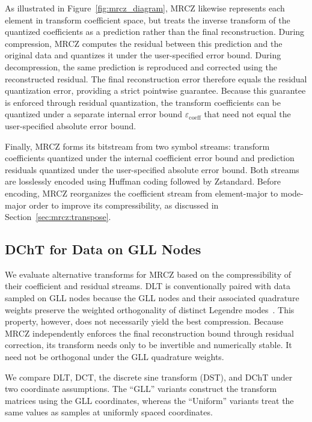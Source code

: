 As illustrated in Figure~\ref{fig:mrcz_diagram}, MRCZ likewise represents each element in transform coefficient space, but treats the inverse transform of the quantized coefficients as a prediction rather than the final reconstruction. During compression, MRCZ computes the residual between this prediction and the original data and quantizes it under the user-specified error bound. During decompression, the same prediction is reproduced and corrected using the reconstructed residual. The final reconstruction error therefore equals the residual quantization error, providing a strict pointwise guarantee. Because this guarantee is enforced through residual quantization, the transform coefficients can be quantized under a separate internal error bound $\varepsilon_{\mathrm{coeff}}$ that need not equal the user-specified absolute error bound.

Finally, MRCZ forms its bitstream from two symbol streams: transform coefficients quantized under the internal coefficient error bound and prediction residuals quantized under the user-specified absolute error bound. Both streams are losslessly encoded using Huffman coding followed by Zstandard. Before encoding, MRCZ reorganizes the coefficient stream from element-major to mode-major order to improve its compressibility, as discussed in Section~\ref{sec:mrcz:transpose}.

\subsection{DChT for Data on GLL Nodes}\label{sec:mrcz:transform}

We evaluate alternative transforms for MRCZ based on the compressibility of their coefficient and residual streams. DLT is conventionally paired with data sampled on GLL nodes because the GLL nodes and their associated quadrature weights preserve the weighted orthogonality of distinct Legendre modes~\cite{marin2016spectral}. This property, however, does not necessarily yield the best compression. Because MRCZ independently enforces the final reconstruction bound through residual correction, its transform needs only to be invertible and numerically stable. It need not be orthogonal under the GLL quadrature weights.

We compare DLT, DCT, the discrete sine transform (DST), and DChT under two coordinate assumptions. The ``GLL'' variants construct the transform matrices using the GLL coordinates, whereas the ``Uniform'' variants treat the same values as samples at uniformly spaced coordinates.


